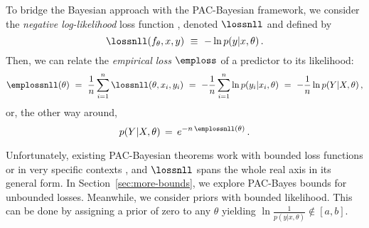 \documentclass{article}
\theoremstyle{definition}
\theoremstyle{plain}
\begin{document}
To bridge the Bayesian approach with the PAC-Bayesian framework, we consider the \emph{negative log-likelihood} loss function 
%
\citep{banerjee-06}, 
denoted $\lossnll$ and defined by 
\begin{equation} \label{eq:loss_vs_likelihood}
\lossnll(f_\theta,x,y) \ \equiv\ -\ln{p(y|x,\theta)}\,.
\end{equation}
Then, we can relate the \emph{empirical loss} $\emploss$ of a predictor to its likelihood:
\begin{equation*}
	\emplossnll(\theta) 
	\ = \ \frac1n \sum_{i=1}^n \lossnll(\theta, x_i ,y_i)
	\ = \  -\frac1n \sum_{i=1}^n \ln p( y_i |x_i, \theta)
   \ = \  -\frac1n \ln p(Y|X,\theta) \,,
\end{equation*}
or, the other way around,
\vspace{-2mm}
\begin{equation} \label{eq:dataset_likelihhod}
p(Y|X,\theta) \, = \, e^{-n\, \emplossnll(\theta)}\,. 
\end{equation}

Unfortunately, existing PAC-Bayesian theorems work with bounded loss functions or in very specific contexts \citep[\eg,][]{dalalyan-08,zhang-06},  and $\lossnll$ spans the whole real axis in its general form. In Section~\ref{sec:more-bounds}, we explore PAC-Bayes bounds for unbounded losses. Meanwhile, we consider priors with bounded likelihood. This can be done by assigning a prior of zero to any $\theta$ yielding $\ln \frac{1}{p(y|x,\theta)} \notin [a,b]$. 
%
\end{document}
